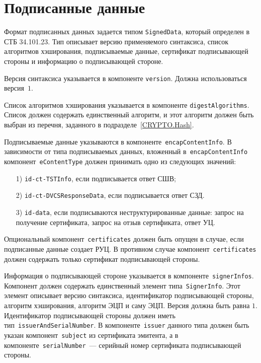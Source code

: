 \section{Подписанные данные}\label{FMT.SignedData}

Формат подписанных данных задается типом \texttt{SignedData}, 
который определен в СТБ 34.101.23. Тип описывает версию применяемого 
синтаксиса, список алгоритмов хэширования, подписываемые данные, 
сертификат подписывающей стороны и информацию о подписывающей стороне. 

Версия синтаксиса указывается в компоненте \texttt{version}.
Должна использоваться версия~$1$.

Список алгоритмов хэширования указывается в компоненте
\texttt{digestAlgorithms}. Список должен содержать единственный алгоритм,
и этот алгоритм должен быть выбран из перечня, 
заданного в подразделе~\ref{CRYPTO.Hash}.

Подписываемые данные указываются в компоненте~\texttt{encapContentInfo}. 
%
В зависимости от типа подписываемых данных, вложенный 
в~\texttt{encapContentInfo} компонент~\texttt{eContentType} 
должен принимать одно из следующих значений:
\begin{enumerate}
\item[1)]
\texttt{id-ct-TSTInfo}, если подписывается ответ СШВ;
\item[2)]
\texttt{id-ct-DVCSResponseData}, если подписывается ответ СЗД. 
\item[3)]
\texttt{id-data}, если подписываются неструктурированные данные:
запрос на получение сертификата, запрос на отзыв сертификата,
ответ УЦ.
\end{enumerate}

Опциональный компонент~\texttt{certificates} должен быть опущен в случае, 
если подписанные данные создает РУЦ. В противном случае 
компонент~\texttt{certificates} должен содержать только сертификат 
подписывающей стороны.

Информация о подписывающей стороне указывается в
компоненте~\texttt{signerInfos}. Компонент должен содержать единственный
элемент типа~\texttt{SignerInfo}. Этот элемент описывает версию синтаксиса,
идентификатор подписывающей стороны, алгоритм хэширования, алгоритм ЭЦП и
саму ЭЦП. Версия должна быть равна $1$. Идентификатор подписывающей стороны
должен иметь тип~\texttt{issuerAndSerialNumber}. В компоненте~\texttt{issuer} данного типа 
должен быть указан компонент~\texttt{subject} из сертификата эмитента, а в 
компоненте~\texttt{serialNumber}~--- серийный номер сертификата 
подписывающей стороны. 

